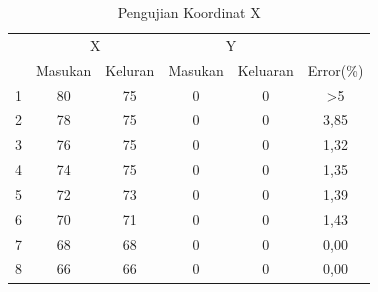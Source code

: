  \begin{longtable}{|c|c|c|c|c|c|}
 	\caption{Pengujian Koordinat X}
 	\label{tbl.x}\\
 	\hline
 	\rowcolor[HTML]{656565} 
 	\cellcolor[HTML]{656565}                     & \multicolumn{2}{c|}{\cellcolor[HTML]{656565}X} & \multicolumn{2}{c|}{\cellcolor[HTML]{656565}Y} & \cellcolor[HTML]{656565}                           \\ \cline{2-5}
 	\rowcolor[HTML]{656565} 
 	\multirow{-2}{*}{\cellcolor[HTML]{656565}No} & Masukan                & Keluran               & Masukan               & Keluaran               & \multirow{-2}{*}{\cellcolor[HTML]{656565}Error(\%)} \\ \hline
 		\endfirsthead
 		\endhead
 		1                                            & 80                     & 75                    & 0                     & 0                      & >5                                               \\ \hline
 		2                                            & 78                     & 75                    & 0                     & 0                      & 3,85                                               \\ \hline
 		3                                            & 76                     & 75                    & 0                     & 0                      & 1,32                                               \\ \hline
 		4                                            & 74                     & 75                    & 0                     & 0                      & 1,35                                               \\ \hline
 		5                                            & 72                     & 73                    & 0                     & 0                      & 1,39                                               \\ \hline
 		6                                            & 70                     & 71                    & 0                     & 0                      & 1,43                                               \\ \hline
 		7                                            & 68                     & 68                    & 0                     & 0                      & 0,00                                               \\ \hline
 		8                                            & 66                     & 66                    & 0                     & 0                      & 0,00                                               \\ \hline

\end{longtable}
